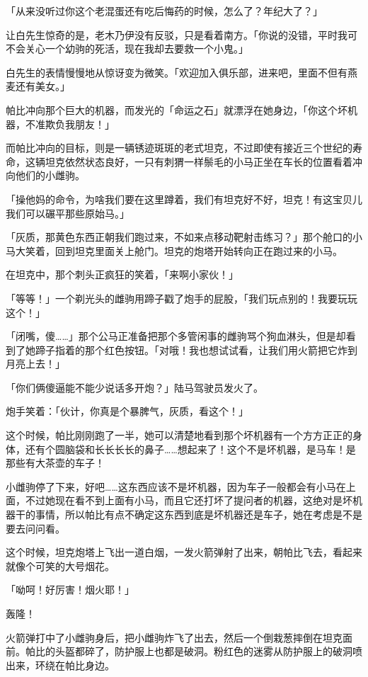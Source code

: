 「从来没听过你这个老混蛋还有吃后悔药的时候，怎么了？年纪大了？」

让白先生惊奇的是，老木乃伊没有反驳，只是看着南方。「你说的没错，平时我可不会关心一个幼驹的死活，现在我却去要救一个小鬼。」

白先生的表情慢慢地从惊讶变为微笑。「欢迎加入俱乐部，进来吧，里面不但有燕麦还有美女。」

\horizonline


帕比冲向那个巨大的机器，而发光的「命运之石」就漂浮在她身边，「你这个坏机器，不准欺负我朋友！」

而帕比冲向的目标，则是一辆锈迹斑斑的老式坦克，不过即使有接近三个世纪的寿命，这辆坦克依然状态良好，一只有刺猬一样鬃毛的小马正坐在车长的位置看着冲向他们的小雌驹。

「操他妈的命令，为啥我们要在这里蹲着，我们有坦克好不好，坦克！有这宝贝儿我们可以碾平那些原始马。」

「灰质，那黄色东西正朝我们跑过来，不如来点移动靶射击练习？」那个舱口的小马大笑着，回到坦克里面关上舱门。坦克的炮塔开始转向正在跑过来的小马。

在坦克中，那个刺头正疯狂的笑着，「来啊小家伙！」

「等等！」一个剃光头的雌驹用蹄子戳了炮手的屁股，「我们玩点别的！我要玩玩这个！」

「闭嘴，傻……」那个公马正准备把那个多管闲事的雌驹骂个狗血淋头，但是却看到了她蹄子指着的那个红色按钮。「对哦！我也想试试看，让我们用火箭把它炸到月亮上去！」

「你们俩傻逼能不能少说话多开炮？」陆马驾驶员发火了。

炮手笑着：「伙计，你真是个暴脾气，灰质，看这个！」

这个时候，帕比刚刚跑了一半，她可以清楚地看到那个坏机器有一个方方正正的身体，还有个圆脑袋和长长长长的鼻子……想起来了！这个不是坏机器，是马车！是那些有大茶壶的车子！

小雌驹停了下来，好吧……这东西应该不是坏机器，因为车子一般都会有小马在上面，不过她现在看不到上面有小马，而且它还打坏了提问者的机器，这绝对是坏机器干的事情，所以帕比有点不确定这东西到底是坏机器还是车子，她在考虑是不是要去问问看。

这个时候，坦克炮塔上飞出一道白烟，一发火箭弹射了出来，朝帕比飞去，看起来就像个可笑的大号烟花。

「呦呵！好厉害！烟火耶！」

轰隆！

火箭弹打中了小雌驹身后，把小雌驹炸飞了出去，然后一个倒栽葱摔倒在坦克面前。帕比的头盔都碎了，防护服上也都是破洞。粉红色的迷雾从防护服上的破洞喷出来，环绕在帕比身边。

